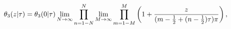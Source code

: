 \[\mathop{\theta_{3}\/}\nolimits\!\left(z\middle|\tau\right)=\mathop{\theta_{3}%
\/}\nolimits\!\left(0\middle|\tau\right)\*\lim_{N\to\infty}\prod_{n=1-N}^{N}%
\lim_{M\to\infty}\prod_{m=1-M}^{M}\left(1+\frac{z}{(m-\tfrac{1}{2}+(n-\tfrac{1%
}{2})\tau)\pi}\right),\]